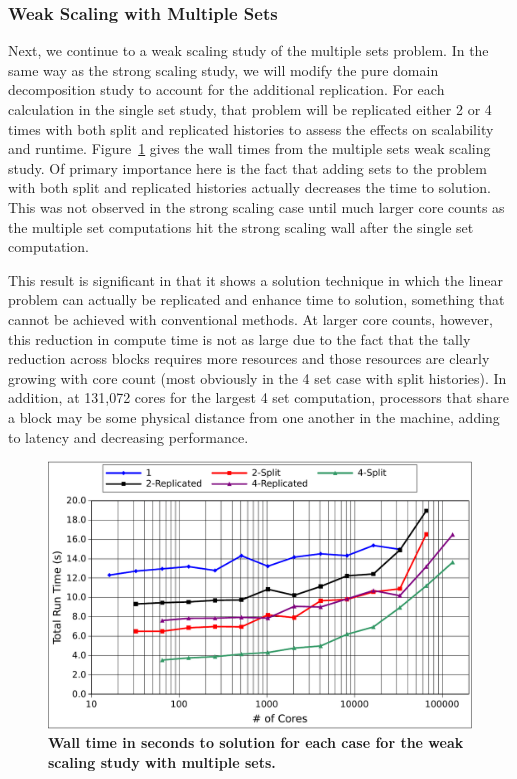 \subsubsection{Weak Scaling with Multiple Sets}
\label{subsubsec:ms_weak}

Next, we continue to a weak scaling study of the multiple sets
problem. In the same way as the strong scaling study, we will modify
the pure domain decomposition study to account for the additional
replication. For each calculation in the single set study, that
problem will be replicated either 2 or 4 times with both split and
replicated histories to assess the effects on scalability and
runtime. Figure~\ref{fig:titan_weak_ms_time} gives the wall times from
the multiple sets weak scaling study. Of primary importance here is
the fact that adding sets to the problem with both split and
replicated histories actually decreases the time to solution. This was
not observed in the strong scaling case until much larger core counts
as the multiple set computations hit the strong scaling wall after the
single set computation.

This result is significant in that it shows a solution technique in
which the linear problem can actually be replicated and enhance time
to solution, something that cannot be achieved with conventional
methods. At larger core counts, however, this reduction in compute
time is not as large due to the fact that the tally reduction across
blocks requires more resources and those resources are clearly growing
with core count (most obviously in the 4 set case with split
histories). In addition, at 131,072 cores for the largest 4 set
computation, processors that share a block may be some physical
distance from one another in the machine, adding to latency and
decreasing performance.

\begin{figure}[t!]
  \begin{center}
    \includegraphics[width=6in]{chapters/parallel_mc/titan_weak_ms_time.pdf}
  \end{center}
  \caption{\textbf{Wall time in seconds to solution for each case for
      the weak scaling study with multiple sets.}}
  \label{fig:titan_weak_ms_time}
\end{figure}

